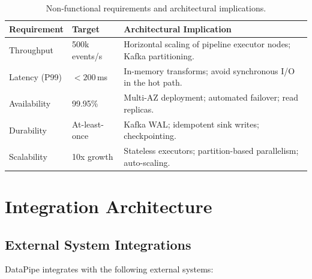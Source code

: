 \documentclass[
    language=english,
    doctype=technical-report,
    institution=none,
    titlestyle=book,
    oneside,
]{../../omnilatex}
\begin{document}
\begin{table}[htbp]
    \centering
    \caption{Non-functional requirements and architectural implications.}
    \label{tab:nfr}
    \begin{tabular}{@{}p{3.5cm}p{4cm}p{5cm}@{}}
        \toprule
        Requirement & Target & Architectural Implication \\
        \midrule
        Throughput & 500k events/s & Horizontal scaling of pipeline
            executor nodes; Kafka partitioning. \\
        Latency (P99) & $< 200$\,ms & In-memory transforms; avoid
            synchronous I/O in the hot path. \\
        Availability & 99.95\% & Multi-AZ deployment; automated failover;
            read replicas. \\
        Durability & At-least-once & Kafka WAL; idempotent sink writes;
            checkpointing. \\
        Scalability & 10x growth & Stateless executors; partition-based
            parallelism; auto-scaling. \\
        \bottomrule
    \end{tabular}
\end{table}

\chapter{Integration Architecture}
\label{sec:integration}

\section{External System Integrations}

DataPipe integrates with the following external systems:
\end{document}
